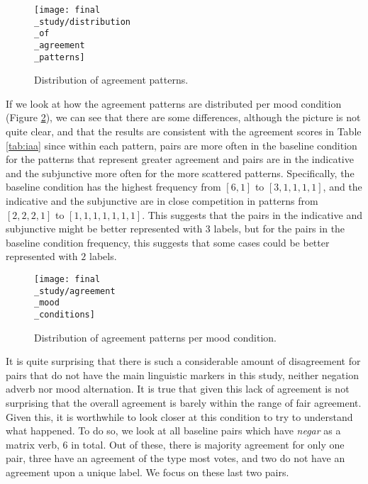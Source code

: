 \begin{figure}
\parbox{15cm}{\texttt{[image: final\\\_study/distribution\\\_of\\\_agreement\\\_patterns]}
\caption{Distribution of agreement patterns.}\label{fig:pat}}
\qquad
\end{figure}

If we look at how the agreement patterns are distributed per mood condition (Figure \ref{fig:moodpat}), we can see that there are some differences, although the picture is not quite clear, and that the results are consistent with the agreement scores in Table \ref{tab:iaa} since within each pattern, pairs are more often in the baseline condition for the patterns that represent greater agreement and pairs are in the indicative and the subjunctive more often for the more scattered patterns. Specifically, the baseline condition has the highest frequency from $[6,1]$ to $[3,1,1,1,1]$, and the indicative and the subjunctive are in close competition in patterns from $[2,2,2,1]$ to $[1,1,1,1,1,1,1]$. This suggests that the pairs in the indicative and subjunctive might be better represented with 3 labels, but for the pairs in the baseline condition frequency, this suggests that some cases could be better represented with $2$ labels.\\

\begin{figure}
\parbox{15cm}{\texttt{[image: final\\\_study/agreement\\\_mood\\\_conditions]}
\caption{Distribution of agreement patterns per mood condition.}\label{fig:moodpat}}
\qquad
\end{figure}

It is quite surprising that there is such a considerable amount of disagreement for pairs that do not have the main linguistic markers in this study, neither negation adverb nor mood alternation. It is true that given this lack of agreement is not surprising that the overall agreement is barely within the range of fair agreement. Given this, it is worthwhile to look closer at this condition to try to understand what happened. To do so, we look at all baseline pairs which have \textit{negar} as a matrix verb, $6$ in total. Out of these, there is majority agreement for only one pair, three have an agreement of the type most votes, and two do not have an agreement upon a unique label. We focus on these last two pairs.\\

